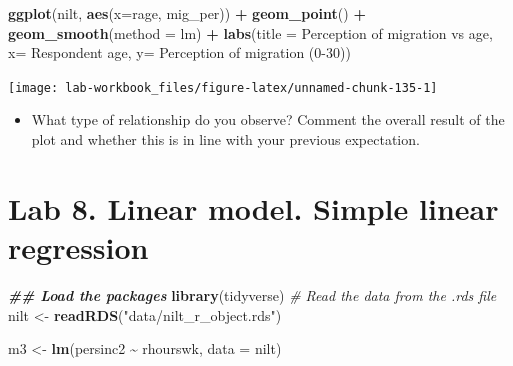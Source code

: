 \documentclass[
]{book}
\newenvironment{Shaded}{\begin{snugshade}}{\end{snugshade}}
\newcommand{\AttributeTok}[1]{\textcolor[rgb]{0.13,0.29,0.53}{#1}}
\newcommand{\CommentTok}[1]{\textcolor[rgb]{0.56,0.35,0.01}{\textit{#1}}}
\newcommand{\DocumentationTok}[1]{\textcolor[rgb]{0.56,0.35,0.01}{\textbf{\textit{#1}}}}
\newcommand{\FunctionTok}[1]{\textcolor[rgb]{0.13,0.29,0.53}{\textbf{#1}}}
\newcommand{\NormalTok}[1]{#1}
\newcommand{\OtherTok}[1]{\textcolor[rgb]{0.56,0.35,0.01}{#1}}
\newcommand{\SpecialCharTok}[1]{\textcolor[rgb]{0.81,0.36,0.00}{\textbf{#1}}}
\newcommand{\StringTok}[1]{\textcolor[rgb]{0.31,0.60,0.02}{#1}}
\providecommand{\tightlist}{%
  \setlength{\itemsep}{0pt}\setlength{\parskip}{0pt}}
\begin{document}
\begin{Shaded}
\begin{Highlighting}[]
\FunctionTok{ggplot}\NormalTok{(nilt, }\FunctionTok{aes}\NormalTok{(}\AttributeTok{x=}\NormalTok{rage, mig\_per)) }\SpecialCharTok{+}
  \FunctionTok{geom\_point}\NormalTok{() }\SpecialCharTok{+}
  \FunctionTok{geom\_smooth}\NormalTok{(}\AttributeTok{method =} \StringTok{\textquotesingle{}lm\textquotesingle{}}\NormalTok{) }\SpecialCharTok{+}
  \FunctionTok{labs}\NormalTok{(}\AttributeTok{title =} \StringTok{\textquotesingle{}Perception of migration vs age\textquotesingle{}}\NormalTok{,}
       \AttributeTok{x=} \StringTok{\textquotesingle{}Respondent age\textquotesingle{}}\NormalTok{, }\AttributeTok{y=} \StringTok{\textquotesingle{}Perception of migration (0{-}30)\textquotesingle{}}\NormalTok{)}
\end{Highlighting}
\end{Shaded}

\begin{flushleft}\texttt{[image: lab-workbook\_files/figure-latex/unnamed-chunk-135-1]} \end{flushleft}

\begin{itemize}
\tightlist
\item
  What type of relationship do you observe? Comment the overall result of the plot and whether this is in line with your previous expectation.
\end{itemize}

\hypertarget{lab-8.-linear-model.-simple-linear-regression}{%
\section{Lab 8. Linear model. Simple linear regression}\label{lab-8.-linear-model.-simple-linear-regression}}

\begin{Shaded}
\begin{Highlighting}[]
\DocumentationTok{\#\# Load the packages}
\FunctionTok{library}\NormalTok{(tidyverse)}
\CommentTok{\# Read the data from the .rds file}
\NormalTok{nilt }\OtherTok{\textless{}{-}} \FunctionTok{readRDS}\NormalTok{(}\StringTok{"data/nilt\_r\_object.rds"}\NormalTok{)}
\end{Highlighting}
\end{Shaded}

\begin{Shaded}
\begin{Highlighting}[]
\NormalTok{m3 }\OtherTok{\textless{}{-}} \FunctionTok{lm}\NormalTok{(persinc2 }\SpecialCharTok{\textasciitilde{}}\NormalTok{ rhourswk, }\AttributeTok{data =}\NormalTok{ nilt)}
\end{Highlighting}
\end{Shaded}
\end{document}

